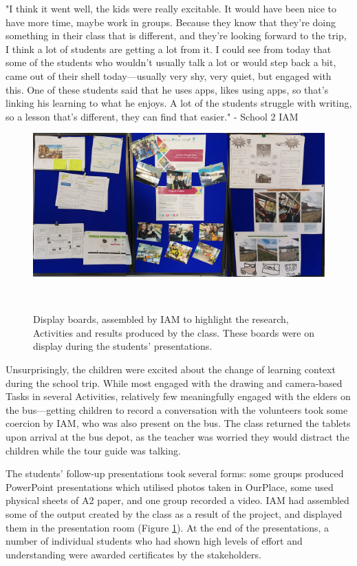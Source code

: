 \begin{displayquote}
"I think it went well, the kids were really excitable. It would have been nice to have more time, maybe work in groups. Because they know that they're doing something in their class that is different, and they're looking forward to the trip, I think a lot of students are getting a lot from it. I could see from today that some of the students who wouldn't usually talk a lot or would step back a bit, came out of their shell today---usually very shy, very quiet, but engaged with this. One of these students said that he uses apps, likes using apps, so that's linking his learning to what he enjoys. A lot of the students struggle with writing, so a lesson that's different, they can find that easier." - School 2 IAM
\end{displayquote}

\begin{figure}
\centering
  \includegraphics[width=1\columnwidth]{images/chapter08/displayBoards.jpg}
  \caption[Display boards showing students' work]{Display boards, assembled by IAM to highlight the research, Activities and results produced by the class. These boards were on display during the students' presentations.}~\label{fig:DisplayBoards}
\end{figure}

Unsurprisingly, the children were excited about the change of learning context during the school trip. While most engaged with the drawing and camera-based Tasks in several Activities, relatively few meaningfully engaged with the elders on the bus---getting children to record a conversation with the volunteers took some coercion by IAM, who was also present on the bus. The class returned the tablets upon arrival at the bus depot, as the teacher was worried they would distract the children while the tour guide was talking.

The students' follow-up presentations took several forms: some groups produced PowerPoint presentations which utilised photos taken in OurPlace, some used physical sheets of A2 paper, and one group recorded a video. IAM had assembled some of the output created by the class as a result of the project, and displayed them in the presentation room (Figure \ref{fig:DisplayBoards}). At the end of the presentations, a number of individual students who had shown high levels of effort and understanding were awarded certificates by the stakeholders.

